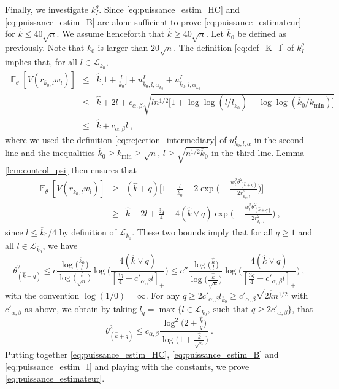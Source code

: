 \documentclass[twoside,11pt]{article}
\def\beq{\begin{equation}}
\def\eeq{\end{equation}}
\def\beqn{\begin{eqnarray*}}
\def\eeqn{\end{eqnarray*}}
\def\cL{\mathcal{L}}
\newcommand{\E}{\operatorname{\mathbb{E}}}
\newcommand{\<}{\langle}
\renewcommand{\>}{\rangle}
\begin{document}
Finally, we investigate  $k^{\theta}_I$. Since  \eqref{eq:puissance_estim_HC} and \eqref{eq:puissance_estim_B} are alone sufficient to prove \eqref{eq:puissance_estimateur} for $\widehat{k}\leq 40\sqrt{n}$. We assume henceforth that $\widehat{k}\geq 40\sqrt{n}$. Let $\overline{k}_0$ be defined as previously. Note that $\overline{k}_0$ is larger than $20\sqrt{n}$. The definition \eqref{eq:def_K_I} of $k^{\theta}_{I}$ implies that, for all $l\in \cL_{\overline{k}_0}$, 
\beqn 
\E_{\theta}[V(r_{\overline{k}_0,l}w_l)]&\leq& \widehat{k}\big[1+ \frac{l}{\overline{k}_0}\big]+ u^I_{\overline{k}_0,l,\alpha_{\overline{k}_0}}+ u^I_{\overline{k}_0,l,\alpha_{\overline{k}_0}}\\
&\leq & \widehat{k}+ 2l+ c_{\alpha,\beta}\sqrt{ln^{1/2}\big[1 + \log\log(l/l_{\overline{k}_0})+ \log\log(\overline{k}_0/k_{\min})]}\\
&\leq & \widehat{k}+ c_{\alpha,\beta} l\ ,
\eeqn 
where we used the definition \eqref{eq:rejection_intermediary} of $u^{I}_{k_0,l,\alpha}$ in the second line and the inequalities $\overline{k}_0\geq k_{\min}\geq \sqrt{n}$, $l\geq \sqrt{n^{1/2}\overline{k}_0}$ in the third line. Lemma \ref{lem:control_psi} then ensures that
\beqn 
\E_{\theta}[V(r_{\overline{k}_0,l}w_l)]&\geq& (\widehat{k}+q)\Big[1 - \frac{l}{\overline{k}_0}-2\exp\Big(-\frac{w^2_l\theta^2_{(\widehat{k}+q)}}{2r^2_{\overline{k}_0,l}}\Big)\Big]\\
&\geq & \widehat{k}- 2l +\frac{3q}{4} - 4(\widehat{k}\vee q)\exp\Big(-\frac{w^2_l\theta^2_{(\widehat{k}+q)}}{2r^2_{\overline{k}_0,l}}\Big) \ , 
\eeqn 
since $l\leq \overline{k}_0/4$ by definition of $\cL_{\overline{k}_0}$. These two bounds imply that for all $q\geq 1$ and all $l\in \cL_{\overline{k}_0}$, we have
\[
 \theta^2_{(\widehat{k}+q)}\leq c\frac{\log\big(\frac{\overline{k}_0}{l}\big)}{\log\big(\frac{l}{\sqrt{n}}\big)} \log\Big(\frac{4(\widehat{k}\vee q)}{[\frac{3q}{4}-c'_{\alpha,\beta}l]_+}\Big)\leq c''\frac{\log\big(\frac{\widehat{k}}{l}\big)}{\log\big(\frac{\widehat{k}}{\sqrt{n}}\big)} \log\Big(\frac{4(\widehat{k}\vee q)}{[\frac{3q}{4}-c'_{\alpha,\beta}l]_+}\big) \ , 
\]
with the convention $\log(1/0)=\infty$. For any $q\geq 2c'_{\alpha,\beta}l_{\overline{k}_0}\geq c'_{\alpha,\beta}\sqrt{2\widehat{k}n^{1/2}}$ with $c'_{\alpha,\beta}$ as above, we obtain by taking $l_q=\max\{l \in \cL_{k_0},\ \text{such that } q \geq 2c'_{\alpha,\beta}\}$, that 
\beq\label{eq:puissance_estim_I}
\theta^2_{(\widehat{k}+q)}\leq c_{\alpha,\beta} \frac{\log^2\big(2 + \frac{\widehat{k}}{q}\big)}{\log\big(1+\frac{\widehat{k}}{\sqrt{n}}\big)}\ .
\eeq
Putting together \eqref{eq:puissance_estim_HC}, \eqref{eq:puissance_estim_B} and \eqref{eq:puissance_estim_I} and playing with the constants, we prove \eqref{eq:puissance_estimateur}.
\end{document}
